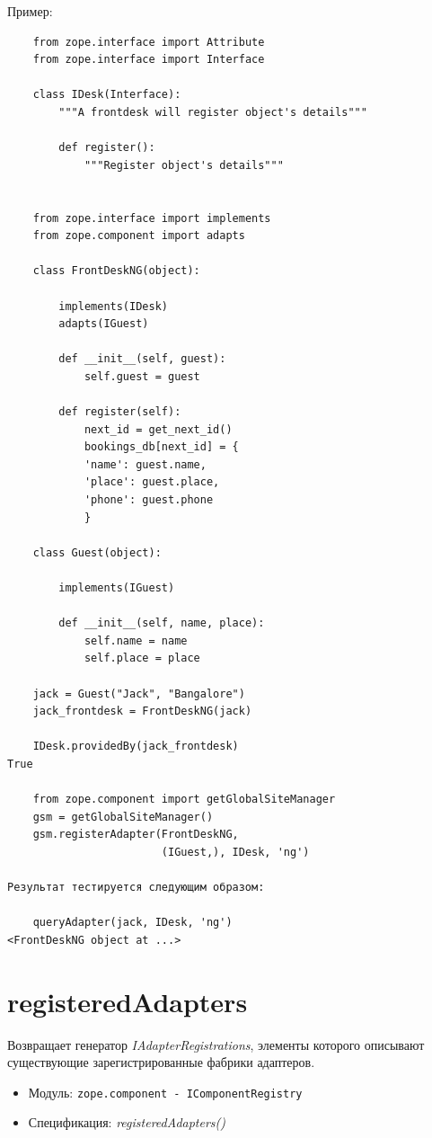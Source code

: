 \documentclass[a4paper,openany,twoside,final]{book}
\providecommand*{\DUroletitlereference}[1]{\textsl{#1}}
\begin{document}
Пример:

\begin{verbatim}
    from zope.interface import Attribute
    from zope.interface import Interface

    class IDesk(Interface):
        """A frontdesk will register object's details"""

        def register():
            """Register object's details"""


    from zope.interface import implements
    from zope.component import adapts

    class FrontDeskNG(object):

        implements(IDesk)
        adapts(IGuest)

        def __init__(self, guest):
            self.guest = guest

        def register(self):
            next_id = get_next_id()
            bookings_db[next_id] = {
            'name': guest.name,
            'place': guest.place,
            'phone': guest.phone
            }

    class Guest(object):

        implements(IGuest)

        def __init__(self, name, place):
            self.name = name
            self.place = place

    jack = Guest("Jack", "Bangalore")
    jack_frontdesk = FrontDeskNG(jack)

    IDesk.providedBy(jack_frontdesk)
True

    from zope.component import getGlobalSiteManager
    gsm = getGlobalSiteManager()
    gsm.registerAdapter(FrontDeskNG,
                        (IGuest,), IDesk, 'ng')

Результат тестируется следующим образом:

    queryAdapter(jack, IDesk, 'ng')
<FrontDeskNG object at ...>
\end{verbatim}


\section*{registeredAdapters%
  \label{registeredadapters}%
}

Возвращает генератор \DUroletitlereference{IAdapterRegistrations}, элементы которого описывают существующие зарегистрированные фабрики адаптеров.

\begin{itemize}

\item Модуль: \texttt{zope.component - IComponentRegistry}

\item Спецификация: \DUroletitlereference{registeredAdapters()}

\end{itemize}
\end{document}

